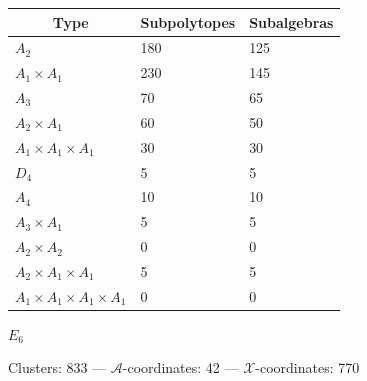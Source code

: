 \documentclass[12pt]{article}
\def\xcoords{$\mathcal{X}$-coordinates}
\def\acoords{$\mathcal{A}$-coordinates}
\begin{document}
\begin{center}
\begin{tabular}{ | l | l | l |} 
\multicolumn{1}{c}{Type} &  \multicolumn{1}{c}{Subpolytopes}  &  \multicolumn{1}{c}{Subalgebras} \\
\hline \(A_2\) & 180 & 125 \\ 
\hline \(A_1 \times A_1\) & 230 & 145 \\ \hline 
\hline \(A_3\) & 70 & 65 \\ 
\hline \(A_2 \times A_1\) & 60 & 50 \\ 
\hline \(A_1 \times A_1 \times A_1\) & 30 & 30 \\ \hline 
\hline \(D_4\) & 5 & 5 \\ 
\hline \(A_4\) & 10 & 10 \\ 
\hline \(A_3 \times A_1\) & 5 & 5 \\ 
\hline \(A_2 \times A_2\) & 0 & 0 \\ 
\hline \(A_2 \times A_1 \times A_1\) & 5 & 5 \\ 
\hline \(A_1 \times A_1 \times A_1 \times A_1\) & 0 & 0 \\ 
\hline
\end{tabular}
\vspace{.5cm}

\newpage

{ \qquad \qquad \Large{\(E_6\)} \hfill}

\vspace{.2cm}
\qquad Clusters: 833 \quad --- \quad \acoords: 42 \quad --- \quad \xcoords: 770 \hfill \\[1em]


\end{center}
\end{document}
